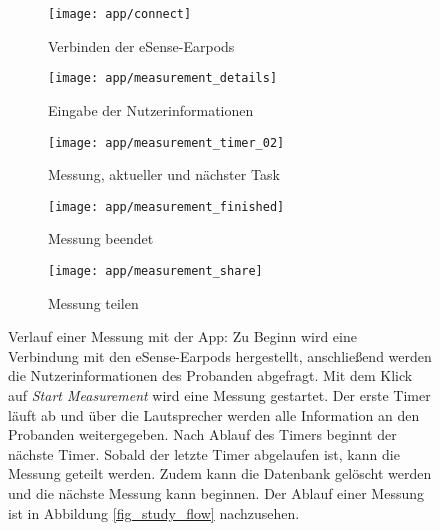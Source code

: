 \begin{figure}[ht]
  \centering
  \begin{subfigure}{.25\textwidth}
    \texttt{[image: app/connect]}
    \caption{Verbinden der eSense-Earpods}
    \label{implementation:app:screenshots:connect_bluetooth}
  \end{subfigure}
  \begin{subfigure}{.25\textwidth}
    \texttt{[image: app/measurement\_details]}
    \caption{Eingabe der Nutzerinformationen}
    \label{implementation:app:screenshots:user_studies_information}
  \end{subfigure}
  \begin{subfigure}{.25\textwidth}
    \texttt{[image: app/measurement\_timer\_02]}
    \caption{Messung, aktueller und nächster Task}
    \label{implementation:app:screenshots:measurement_started}
  \end{subfigure}
  \begin{subfigure}{.25\textwidth}
    \texttt{[image: app/measurement\_finished]}
    \caption{Messung beendet}
    \label{implementation:app:screenshots:sampling_stopped}
  \end{subfigure}
  \begin{subfigure}{.25\textwidth}
    \texttt{[image: app/measurement\_share]}
    \caption{Messung teilen}
    \label{implementation:app:screenshots:share}
  \end{subfigure}
  \caption{Verlauf einer Messung mit der App: Zu Beginn wird eine Verbindung mit den eSense-Earpods hergestellt, anschließend werden die Nutzerinformationen des Probanden abgefragt. Mit dem Klick auf \textit{Start Measurement} wird eine Messung gestartet. Der erste Timer läuft ab und über die Lautsprecher werden alle Information an den Probanden weitergegeben. Nach Ablauf des Timers beginnt der nächste Timer. Sobald der letzte Timer abgelaufen ist, kann die Messung geteilt werden. Zudem kann die Datenbank gelöscht werden und die nächste Messung kann beginnen. Der Ablauf einer Messung ist in Abbildung \ref{fig_study_flow} nachzusehen.}
  \label{implementation:app:screenshots}
\end{figure}

